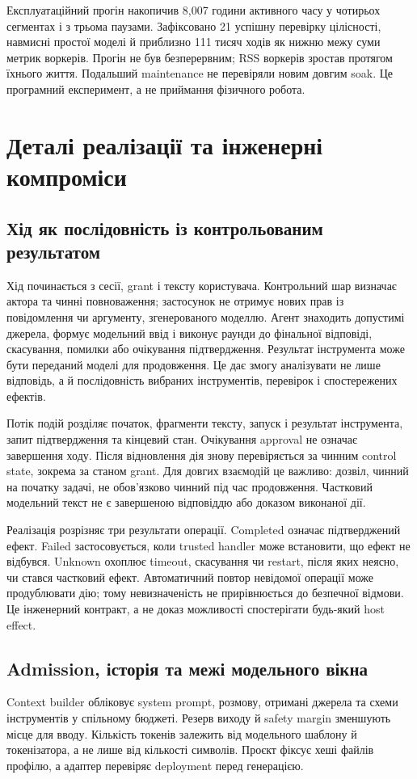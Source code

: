 \documentclass[11pt]{article}
\begin{document}
Експлуатаційний прогін накопичив 8,007 години активного часу у чотирьох сегментах і з трьома паузами. Зафіксовано 21 успішну перевірку цілісності, навмисні простої моделі й приблизно 111 тисяч ходів як нижню межу суми метрик воркерів. Прогін не був безперервним; RSS воркерів зростав протягом їхнього життя. Подальший maintenance не перевіряли новим довгим soak. Це програмний експеримент, а не приймання фізичного робота.


\section{Деталі реалізації та інженерні компроміси}
\subsection{Хід як послідовність із контрольованим результатом}
Хід починається з сесії, grant і тексту користувача. Контрольний шар визначає актора та чинні повноваження; застосунок не отримує нових прав із повідомлення чи аргументу, згенерованого моделлю. Агент знаходить допустимі джерела, формує модельний ввід і виконує раунди до фінальної відповіді, скасування, помилки або очікування підтвердження. Результат інструмента може бути переданий моделі для продовження. Це дає змогу аналізувати не лише відповідь, а й послідовність вибраних інструментів, перевірок і спостережених ефектів.

Потік подій розділяє початок, фрагменти тексту, запуск і результат інструмента, запит підтвердження та кінцевий стан. Очікування approval не означає завершення ходу. Після відновлення дія знову перевіряється за чинним control state, зокрема за станом grant. Для довгих взаємодій це важливо: дозвіл, чинний на початку задачі, не обов'язково чинний під час продовження. Частковий модельний текст не є завершеною відповіддю або доказом виконаної дії.

Реалізація розрізняє три результати операції. Completed означає підтверджений ефект. Failed застосовується, коли trusted handler може встановити, що ефект не відбувся. Unknown охоплює timeout, скасування чи restart, після яких неясно, чи стався частковий ефект. Автоматичний повтор невідомої операції може продублювати дію; тому невизначеність не прирівнюється до безпечної відмови. Це інженерний контракт, а не доказ можливості спостерігати будь-який host effect.

\subsection{Admission, історія та межі модельного вікна}
Context builder обліковує system prompt, розмову, отримані джерела та схеми інструментів у спільному бюджеті. Резерв виходу й safety margin зменшують місце для вводу. Кількість токенів залежить від модельного шаблону й токенізатора, а не лише від кількості символів. Проєкт фіксує хеші файлів профілю, а адаптер перевіряє deployment перед генерацією.
\end{document}
